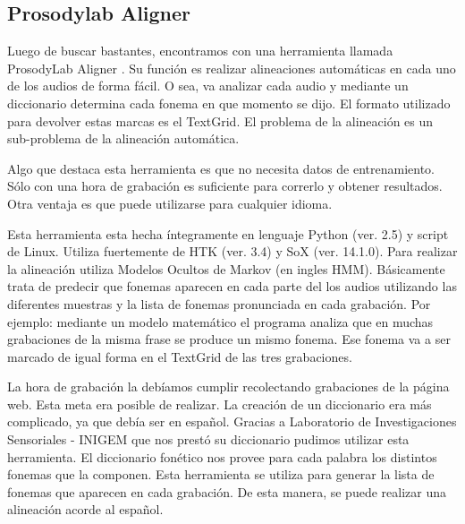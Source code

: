 \documentclass[11pt,a4paper,twoside]{tesis}
\begin{document}
\subsection{Prosodylab Aligner}


Luego de buscar bastantes, encontramos con una herramienta llamada ProsodyLab Aligner \cite{prosodylab}. Su función es realizar alineaciones automáticas en cada uno de los audios de forma fácil. O sea, va analizar cada audio y mediante un diccionario determina cada fonema en que momento se dijo. El formato utilizado para devolver estas marcas es el TextGrid. El problema de la alineación es un sub-problema de la alineación automática.

Algo que destaca esta herramienta es que no necesita datos de entrenamiento. Sólo con una hora de grabación es suficiente para correrlo y obtener resultados. Otra ventaja es que puede utilizarse para cualquier idioma. 

Esta herramienta esta hecha íntegramente en lenguaje Python (ver. 2.5) y script de Linux. Utiliza fuertemente de HTK (ver. 3.4) y SoX (ver. 14.1.0). Para realizar la alineación utiliza Modelos Ocultos de Markov \cite{rabiner} (en ingles HMM). Básicamente trata de predecir que fonemas aparecen en cada parte del los audios utilizando las diferentes muestras y la lista de fonemas pronunciada en cada grabación. Por ejemplo: mediante un modelo matemático el programa analiza que en muchas grabaciones de la misma frase se produce un mismo fonema. Ese fonema va a ser marcado de igual forma en el TextGrid de las tres grabaciones.


La hora de grabación la debíamos cumplir recolectando grabaciones de la página web. Esta meta era posible de realizar. La creación de un diccionario era más complicado, ya que debía ser en español. Gracias a Laboratorio de Investigaciones Sensoriales - INIGEM que nos prestó su diccionario pudimos utilizar esta herramienta. El diccionario fonético nos provee para cada palabra los distintos fonemas que la componen. Esta herramienta se utiliza para generar la lista de fonemas que aparecen en cada grabación. De esta manera, se puede realizar una alineación acorde al español.
\end{document}
